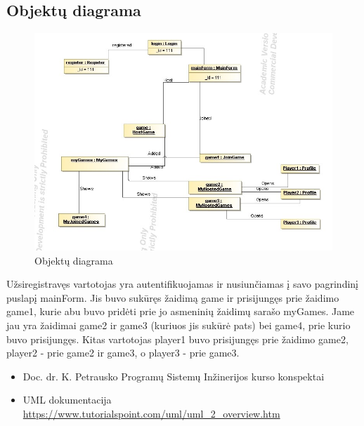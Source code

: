 \documentclass{VUMIFPSkursinis}
\begin{document}
	\subsection*{Objektų diagrama}
		\begin{figure}[H]
				\centering
				\includegraphics[scale=0.5]{img/Object}
				\caption{Objektų diagrama}
				\label{img:Object}
			\end{figure}
		Užsiregistravęs vartotojas yra autentifikuojamas ir nusiunčiamas į savo pagrindinį puslapį mainForm. Jis buvo sukūręs žaidimą game ir prisijungęs prie žaidimo game1, kurie abu buvo pridėti prie jo asmeninių žaidimų sarašo myGames. Jame jau yra žaidimai game2 ir game3 (kuriuos jis sukūrė pats) bei game4, prie kurio buvo prisijungęs. Kitas vartotojas player1 buvo prisijungęs prie žaidimo game2, player2 - prie game2 ir game3, o player3 - prie game3.
	\begin{itemize}
		\item Doc. dr. K. Petrausko Programų Sistemų Inžinerijos kurso konspektai
		\item UML dokumentacija \url{https://www.tutorialspoint.com/uml/uml_2_overview.htm}
	\end{itemize}
		
\end{document}
